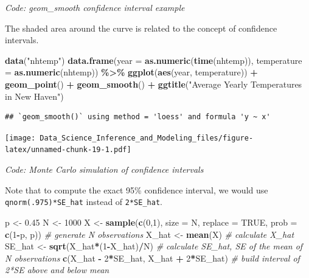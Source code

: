 \documentclass[
]{article}
\newenvironment{Shaded}{\begin{snugshade}}{\end{snugshade}}
\newcommand{\CommentTok}[1]{\textcolor[rgb]{0.56,0.35,0.01}{\textit{#1}}}
\newcommand{\DataTypeTok}[1]{\textcolor[rgb]{0.13,0.29,0.53}{#1}}
\newcommand{\DecValTok}[1]{\textcolor[rgb]{0.00,0.00,0.81}{#1}}
\newcommand{\FloatTok}[1]{\textcolor[rgb]{0.00,0.00,0.81}{#1}}
\newcommand{\KeywordTok}[1]{\textcolor[rgb]{0.13,0.29,0.53}{\textbf{#1}}}
\newcommand{\NormalTok}[1]{#1}
\newcommand{\OperatorTok}[1]{\textcolor[rgb]{0.81,0.36,0.00}{\textbf{#1}}}
\newcommand{\OtherTok}[1]{\textcolor[rgb]{0.56,0.35,0.01}{#1}}
\newcommand{\StringTok}[1]{\textcolor[rgb]{0.31,0.60,0.02}{#1}}
\begin{document}
\emph{Code: geom\_smooth confidence interval example}

The shaded area around the curve is related to the concept of confidence
intervals.

\begin{Shaded}
\begin{Highlighting}[]
\KeywordTok{data}\NormalTok{(}\StringTok{"nhtemp"}\NormalTok{)}
\KeywordTok{data.frame}\NormalTok{(}\DataTypeTok{year =} \KeywordTok{as.numeric}\NormalTok{(}\KeywordTok{time}\NormalTok{(nhtemp)), }\DataTypeTok{temperature =} \KeywordTok{as.numeric}\NormalTok{(nhtemp)) }\OperatorTok{\%\textgreater{}\%}
\StringTok{    }\KeywordTok{ggplot}\NormalTok{(}\KeywordTok{aes}\NormalTok{(year, temperature)) }\OperatorTok{+}
\StringTok{    }\KeywordTok{geom\_point}\NormalTok{() }\OperatorTok{+}
\StringTok{    }\KeywordTok{geom\_smooth}\NormalTok{() }\OperatorTok{+}
\StringTok{    }\KeywordTok{ggtitle}\NormalTok{(}\StringTok{"Average Yearly Temperatures in New Haven"}\NormalTok{)}
\end{Highlighting}
\end{Shaded}

\begin{verbatim}
## `geom_smooth()` using method = 'loess' and formula 'y ~ x'
\end{verbatim}

\texttt{[image: Data\_Science\_Inference\_and\_Modeling\_files/figure-latex/unnamed-chunk-19-1.pdf]}

\emph{Code: Monte Carlo simulation of confidence intervals}

Note that to compute the exact 95\% confidence interval, we would use
\texttt{qnorm(.975)*SE\_hat} instead of \texttt{2*SE\_hat}.

\begin{Shaded}
\begin{Highlighting}[]
\NormalTok{p \textless{}{-}}\StringTok{ }\FloatTok{0.45}
\NormalTok{N \textless{}{-}}\StringTok{ }\DecValTok{1000}
\NormalTok{X \textless{}{-}}\StringTok{ }\KeywordTok{sample}\NormalTok{(}\KeywordTok{c}\NormalTok{(}\DecValTok{0}\NormalTok{,}\DecValTok{1}\NormalTok{), }\DataTypeTok{size =}\NormalTok{ N, }\DataTypeTok{replace =} \OtherTok{TRUE}\NormalTok{, }\DataTypeTok{prob =} \KeywordTok{c}\NormalTok{(}\DecValTok{1}\OperatorTok{{-}}\NormalTok{p, p))    }\CommentTok{\# generate N observations}
\NormalTok{X\_hat \textless{}{-}}\StringTok{ }\KeywordTok{mean}\NormalTok{(X)    }\CommentTok{\# calculate X\_hat}
\NormalTok{SE\_hat \textless{}{-}}\StringTok{ }\KeywordTok{sqrt}\NormalTok{(X\_hat}\OperatorTok{*}\NormalTok{(}\DecValTok{1}\OperatorTok{{-}}\NormalTok{X\_hat)}\OperatorTok{/}\NormalTok{N)    }\CommentTok{\# calculate SE\_hat, SE of the mean of N observations}
\KeywordTok{c}\NormalTok{(X\_hat }\OperatorTok{{-}}\StringTok{ }\DecValTok{2}\OperatorTok{*}\NormalTok{SE\_hat, X\_hat }\OperatorTok{+}\StringTok{ }\DecValTok{2}\OperatorTok{*}\NormalTok{SE\_hat)    }\CommentTok{\# build interval of 2*SE above and below mean}
\end{Highlighting}
\end{Shaded}
\end{document}
